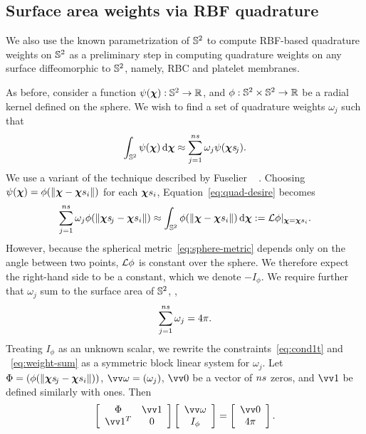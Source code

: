 \subsection{Surface area weights via RBF quadrature}\label{sec:rbf-quadrature}

We also use the known parametrization of $\mathbb{S}^2$ to compute RBF-based quadrature weights
on $\mathbb{S}^2$ as a preliminary step in computing quadrature weights on any surface
diffeomorphic to $\mathbb{S}^2$, namely, RBC and platelet membranes.

As before, consider a function $\psi(\boldsymbol{\chi}):\mathbb{S}^2 \to \mathbb{R}$, and $\phi: \mathbb{S}^2 \times \mathbb{S}^2 \to \mathbb{R}$ be a radial kernel defined on the sphere. We wish to find a set
of quadrature weights $\omega_j$ such that
\begin{equation}\label{eq:quad-desire}
    \int_{\sphere} \psi(\Xp) \d\Xp \approx \sum_{j=1}^{\sample\cardinality} \omega_j \psi(\Xpsj).
\end{equation}
We use a variant of the technique described by Fuselier ~%
\cite{Fuselier:2013coba}.  Choosing $\psi(\Xp) = \phi(\|\Xp-\sample\Xp_i\|)$ for each
$\sample\Xp_i$, Equation~\eqref{eq:quad-desire} becomes
\begin{equation}
    \sum_{j=1}^{\sample\cardinality} \omega_j \phi(\|\Xpsj-\sample\Xp_i\|)
    \approx \int_{\sphere}\phi(\|\Xp-\sample\Xp_i\|) \d\Xp := \L\phi|_{\Xp=\sample\Xp_i}.
    \label{eq:cond1t}
\end{equation}
However, because the spherical metric~\eqref{eq:sphere-metric} depends only on the angle
between two points, $\mathcal{L}\phi$ is constant over
the sphere. We therefore expect the right-hand side to be a constant, which we denote
$-I_\phi$. We require further that $\omega_j$ sum to the surface area of $\mathbb{S}^2$,
,
\begin{equation}
    \sum_{j=1}^{\sample\cardinality} \omega_j  = 4\pi.
    \label{eq:weight-sum}
\end{equation}
Treating $I_\phi$ as an unknown scalar, we rewrite the constraints~\eqref{eq:cond1t} and%
~\eqref{eq:weight-sum} as a symmetric block linear system for $\omega_j$. Let
$\Phi = (\phi(\|\Xpsj - \sample\Xp_i\|))$, $\arr{\omega} = (\omega_j)$, $\arr{0}$ 
be a vector of $\sample\cardinality$ zeros, and $\arr{1}$ be defined similarly with ones.
Then
\begin{equation}\label{eq:rbf-quadrature}
    \left[\begin{array}{cc}
            \Phi & \arr{1} \\ \arr{1}^T & 0
    \end{array}\right]\left[\begin{array}{cc}
            \arr{\omega} \\ I_\phi
    \end{array}\right] = \left[\begin{array}{c}
            \arr{0} \\ 4\pi
    \end{array}\right].
\end{equation}

